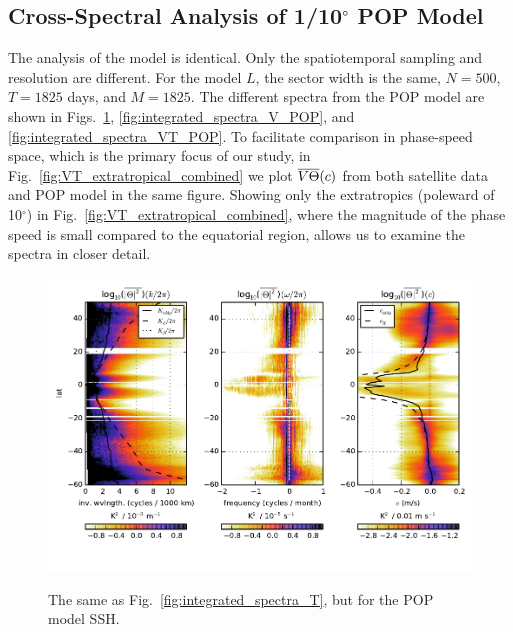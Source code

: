 \documentclass[10pt]{article}
\newcommand{\ol}{\ensuremath{\overline}}
\begin{document}
\subsection{Cross-Spectral Analysis of 1/10$^\circ$ POP Model}

The analysis of the model is identical. Only the spatiotemporal sampling and resolution are different. For the model $L$, the sector width is the same, $N = 500$, $T=1825$ days, and $M=1825$. The different spectra from the POP model are shown in Figs.~\ref{fig:integrated_spectra_T_POP}, \ref{fig:integrated_spectra_V_POP}, and \ref{fig:integrated_spectra_VT_POP}. To facilitate comparison in phase-speed space, which is the primary focus of our study, in Fig.~\ref{fig:VT_extratropical_combined} we plot $\ol{V\Theta}(c)$ from both satellite data and POP model in the same figure. Showing only the extratropics (poleward of 10$^\circ$) in Fig.~\ref{fig:VT_extratropical_combined}, where the magnitude of the phase speed is small compared to the equatorial region, allows us to examine the spectra in closer detail.

\begin{figure}[t]
  \noindent\includegraphics{../figures/POP_50degwide/integrated_spectra_T.pdf}\\
  \caption{The same as Fig.~\ref{fig:integrated_spectra_T}, but for the POP model SSH.}
  \label{fig:integrated_spectra_T_POP}
\end{figure}
\end{document}
